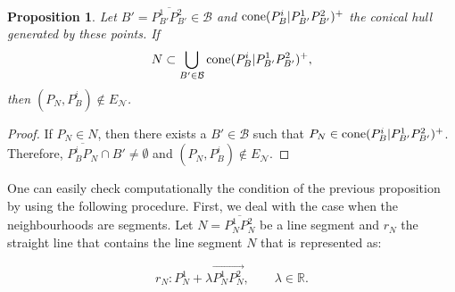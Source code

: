 \documentclass[a4paper,  review, authoryear, 1p.]{elsarticle}
\newcommand{\EN}{{E^{}_{\mathcal N}}}
\newtheorem{prop}{Proposition}
\begin{document}
		\begin{prop}
			
			Let $B'=\overline{P^1_{B'}P^2_{B'}}\in\mathcal B$ and $\normalfont{\text{cone}}(P^i_B|P^1_{B'}P^2_{B'})^+$ the conical hull generated by these points. If
			$$N\subset\bigcup_{B'\in\mathcal B}\normalfont{\text{cone}}(P^i_B| P^1_{B'}P^2_{B'})^+,$$
			then $(P^{}_N, P^i_B)\not\in \EN$.
			
		\end{prop}
		\begin{proof}
			If $P_N\in N$, then there exists a $B'\in\mathcal B$ such that 
			$P_N\in \normalfont{\text{cone}}(P^i_B|P^1_{B'}P^2_{B'})^+$. Therefore, $\overline{P^i_B P^{}_N}\cap B'\neq\emptyset$ and $(P^{}_N, P^i_B)\not\in \EN$.
		\end{proof}
		
		One can easily check computationally the condition of the previous proposition by using the following procedure. First, we deal with the case  when the neighbourhoods are segments. Let $N = \overline{P^1_N P^2_N}$ be a line segment and $r_N$ the straight line that contains the line segment $N$ that is represented as:
		
		$$r_N:P_N^1+\lambda\overrightarrow{P_N^1P_N^2},\qquad\lambda\in\mathbb R.$$
		
\end{document}
